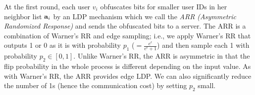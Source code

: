 At the first round, each user $v_i$ obfuscates
bits for smaller user IDs in her neighbor list $\mathbf{a}_i$
by an LDP mechanism which we call the \textit{ARR (Asymmetric Randomized Response)} 
and sends the obfuscated bits to a server. 
The ARR is a combination of Warner's RR and edge sampling; i.e.,
we apply Warner's RR that outputs 1 or 0 as it is with probability
$p_1$ ($=\frac{e^{\epsilon}}{e^{\epsilon}+1}$)
and then sample each 1 with probability $p_2\in[0,1]$.
%
Unlike Warner's RR, the ARR is asymmetric in that the flip probability in the whole process is different
depending on the input value.
As with Warner's RR, the ARR provides edge LDP.
We can also significantly reduce the number of 1s (hence the communication cost) by setting
$p_2$ small.


